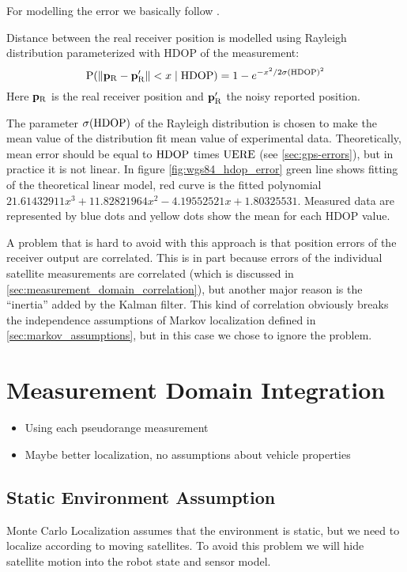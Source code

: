 For modelling the error we basically follow \cite{www-wilson}.

Distance between the real receiver position is modelled using Rayleigh distribution
parameterized with HDOP of the measurement:
\begin{equation}
	\operatorname{\mathrm{P}}(\lVert\mathbf{p_\mathrm{R}} - \mathbf{p'_\mathrm{R}}\rVert < x \mid \mathrm{HDOP}) =
		1 - e^{-x^2/2\sigma(\mathrm{HDOP})^2}
\end{equation}
Here \(\mathbf{p_\mathrm{R}}\) is the real receiver position and \(\mathbf{p'_\mathrm{R}}\)
the noisy reported position.

The parameter \(\sigma(\mathrm{HDOP})\) of the Rayleigh distribution is chosen to make the
mean value of the distribution fit mean value of experimental data.
Theoretically, mean error should be equal to \(\mathrm{HDOP}\) times \(\mathrm{UERE}\) (see \ref{sec:gps-errors}),
but in practice it is not linear.
In figure \ref{fig:wgs84_hdop_error} green line shows fitting of the theoretical linear model,
red curve is the fitted polynomial \(\num{21.61432911}x^3 + \num{11.82821964}x^2 - 
\num{4.19552521}x + \num{1.80325531}\).
Measured data are represented by blue dots and yellow dots show the mean for each HDOP value.

A problem that is hard to avoid with this approach is that position errors of the
receiver output are correlated.
This is in part because errors of the individual satellite measurements are correlated
(which is discussed in \ref{sec:measurement_domain_correlation}), but another major reason
is the \enquote{inertia} added by the Kalman filter.
This kind of correlation obviously breaks the independence assumptions of Markov
localization defined in \ref{sec:markov_assumptions}, but in this case we chose to ignore
the problem. 

\section{Measurement Domain Integration}
\label{sec:measurement_domain}
\begin{itemize}
\item Using each pseudorange measurement
\item Maybe better localization, no assumptions about vehicle properties
\end{itemize}

\subsection{Static Environment Assumption}
\label{sec:gps-mcl-static-env}
Monte Carlo Localization assumes that the environment is static, but we need to
localize according to moving satellites.
To avoid this problem we will hide satellite motion into the robot state and sensor model.

